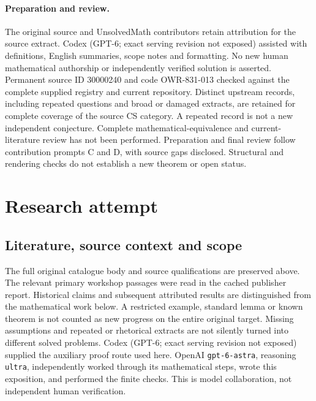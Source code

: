 \documentclass[11pt]{article}
\begin{document}
\paragraph{Preparation and review.}
The original source and UnsolvedMath contributors retain attribution for the source extract. Codex (GPT-6; exact serving revision not exposed) assisted with definitions, English summaries, scope notes and formatting. No new human mathematical authorship or independently verified solution is asserted. Permanent source ID 30000240 and code OWR-831-013 checked against the complete supplied registry and current repository. Distinct upstream records, including repeated questions and broad or damaged extracts, are retained for complete coverage of the source CS category. A repeated record is not a new independent conjecture. Complete mathematical-equivalence and current-literature review has not been performed. Preparation and final review follow contribution prompts C and D, with source gaps disclosed. Structural and rendering checks do not establish a new theorem or open status.
\label{end:30000240}

\section{Research attempt}
\subsection{Literature, source context and scope}
The full original catalogue body and source qualifications are preserved above. The relevant primary workshop passages were read in the cached publisher report. Historical claims and subsequent attributed results are distinguished from the mathematical work below. A restricted example, standard lemma or known theorem is not counted as new progress on the entire original target. Missing assumptions and repeated or rhetorical extracts are not silently turned into different solved problems.
Codex (GPT-6; exact serving revision not exposed) supplied the auxiliary proof route used here. OpenAI \texttt{gpt-6-astra}, reasoning \texttt{ultra}, independently worked through its mathematical steps, wrote this exposition, and performed the finite checks. This is model collaboration, not independent human verification.
\end{document}
